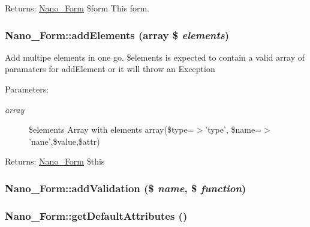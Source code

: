 \begin{Desc}
\item[Returns:]\hyperlink{classNano__Form}{Nano\_\-Form} \$form This form. \end{Desc}
\hypertarget{classNano__Form_31801b2ad37c185877c49a28d31e2094}{
\subsubsection[{addElements}]{\setlength{\rightskip}{0pt plus 5cm}Nano\_\-Form::addElements (array \$ {\em elements})}}
\label{classNano__Form_31801b2ad37c185877c49a28d31e2094}


Add multipe elements in one go. \$elements is expected to contain a valid array of paramaters for addElement or it will throw an Exception

\begin{Desc}
\item[Parameters:]
\begin{description}
\item[{\em array}]\$elements Array with elements array(\$type=$>$'type', \$name=$>$'nane',\$value,\$attr) \end{description}
\end{Desc}
\begin{Desc}
\item[Returns:]\hyperlink{classNano__Form}{Nano\_\-Form} \$this \end{Desc}
\hypertarget{classNano__Form_4d551db84f56be678f9b7cd3c289f7ee}{
\subsubsection[{addValidation}]{\setlength{\rightskip}{0pt plus 5cm}Nano\_\-Form::addValidation (\$ {\em name}, \/  \$ {\em function})}}
\label{classNano__Form_4d551db84f56be678f9b7cd3c289f7ee}


\hypertarget{classNano__Form_8bb0fe1b14babd93577a77ec0620a988}{
\subsubsection[{getDefaultAttributes}]{\setlength{\rightskip}{0pt plus 5cm}Nano\_\-Form::getDefaultAttributes ()}}
\label{classNano__Form_8bb0fe1b14babd93577a77ec0620a988}


